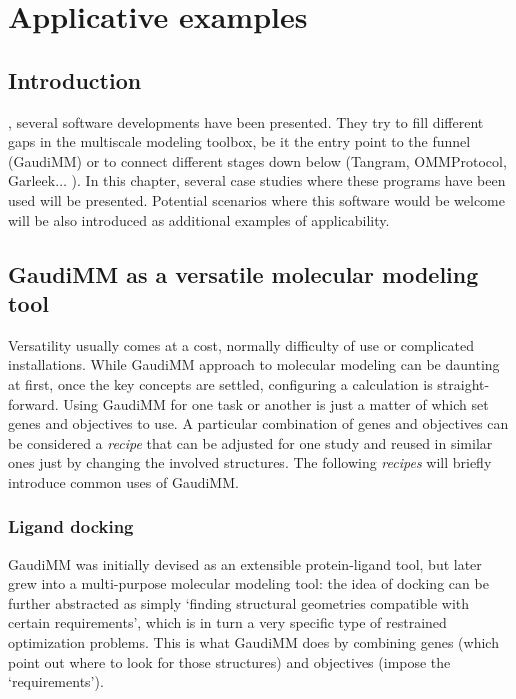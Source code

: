 \chapter{Applicative examples}
\label{chap:06}

\section{Introduction}
, several software developments have been presented. They try to fill different gaps in the multiscale modeling toolbox, be it the entry point to the funnel (GaudiMM) or to connect different stages down below (Tangram, OMMProtocol, Garleek$ \ldots $ ). In this chapter, several case studies where these programs have been used will be presented. Potential scenarios where this software would be welcome will be also introduced as additional examples of applicability.

\section{GaudiMM as a versatile molecular modeling tool}
Versatility usually comes at a cost, normally difficulty of use or complicated installations. While GaudiMM approach to molecular modeling can be daunting at first, once the key concepts are settled, configuring a calculation is straight-forward. Using GaudiMM for one task or another is just a matter of which set genes and objectives to use. A particular combination of genes and objectives can be considered a \textit{recipe} that can be adjusted for one study and reused in similar ones just by changing the involved structures. The following \textit{recipes} will briefly introduce common uses of GaudiMM.

\subsection{Ligand docking}
GaudiMM was initially devised as an extensible protein-ligand tool, but later grew into a multi-purpose molecular modeling tool: the idea of docking can be further abstracted as simply ‘finding structural geometries compatible with certain requirements’, which is in turn a very specific type of restrained optimization problems. This is what GaudiMM does by combining genes (which point out where to look for those structures) and objectives (impose the ‘requirements’).


